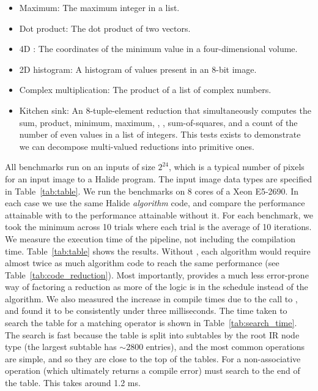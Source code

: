 \begin{itemize}
\item Maximum: The maximum integer in a list.
\item Dot product: The dot product of two vectors.
\item 4D : The coordinates of the minimum value in a four-dimensional volume.
\item 2D histogram: A histogram of values present in an 8-bit image.
\item Complex multiplication: The product of a list of complex numbers.
\item Kitchen sink: An 8-tuple-element reduction that simultaneously computes the sum, product, minimum, maximum, , , sum-of-squares, and a count of the number of even values in a list of integers. This tests exists to demonstrate we can decompose multi-valued reductions into primitive ones.
\end{itemize}

All benchmarks run on an inputs of size $2^{24}$, which is a typical number of pixels for an input image to a Halide program. The input image data types are specified in Table~\ref{tab:table}. We run the benchmarks on 8 cores of a Xeon E5-2690. In each case we use the same Halide \emph{algorithm} code, and compare the performance attainable with  to the performance attainable without it. For each benchmark, we took the minimum across 10 trials where each trial is the average of 10 iterations. We measure the execution time of the pipeline, not including the compilation time. Table~\ref{tab:table} shows the results. Without , each algorithm would require almost twice as much algorithm code to reach the same performance (see Table~\ref{tab:code_reduction}). Most importantly,  provides a much less error-prone way of factoring a reduction as more of the logic is in the schedule instead of the algorithm. We also measured the increase in compile times due to the call to , and found it to be consistently under three milliseconds. The time taken to search the table for a matching operator is shown in Table~\ref{tab:search_time}. The search is fast because the table is split into subtables by the root IR node type (the largest subtable has $\sim 2800$ entries), and the most common operations are simple, and so they are close to the top of the tables. For a non-associative operation (which ultimately returns a compile error)  must search to the end of the table. This takes around 1.2 ms.

